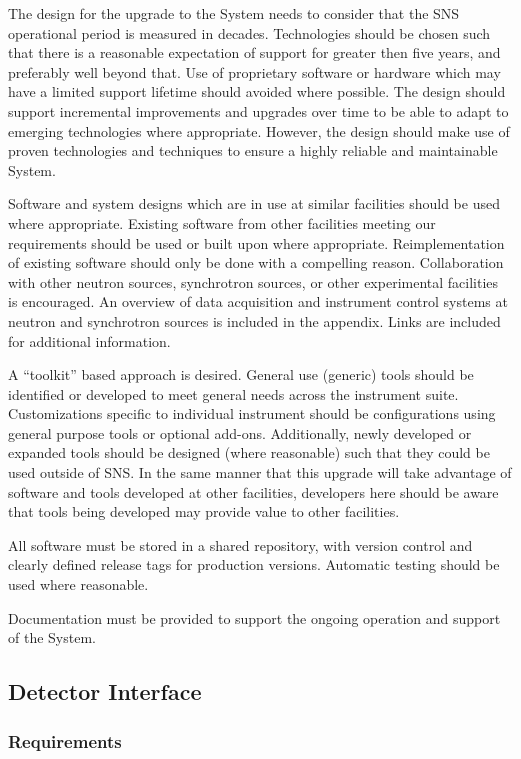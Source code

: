 The design for the upgrade to the System needs to consider that the SNS
operational period is measured in decades. Technologies should be chosen
such that there is a reasonable expectation of support for greater then
five years, and preferably well beyond that.  Use of proprietary software
or hardware which may have a limited support lifetime should avoided where
possible. The design should support incremental improvements and upgrades
over time to be able to adapt to emerging technologies where appropriate.
However, the design should make use of proven technologies and techniques
to ensure a highly reliable and maintainable System.

Software and system designs which are in use at similar facilities
should be used where appropriate.  Existing software from other
facilities meeting our requirements should be used or built upon where
appropriate.  Reimplementation of existing software should only be done
with a compelling reason.  Collaboration with other neutron sources,
synchrotron sources, or other experimental facilities is encouraged.
An overview of data acquisition and instrument control systems at neutron
and synchrotron sources is included in the appendix. Links are included
for additional information.

A ``toolkit'' based approach is desired. General use (generic) tools
should be identified or developed to meet general needs across the
instrument suite. Customizations specific to individual instrument should
be configurations using general purpose tools or optional add-ons.
Additionally, newly developed or expanded tools should be designed
(where reasonable) such that they could be used outside of SNS. In the
same manner that this upgrade will take advantage of software and tools
developed at other facilities, developers here should be aware that
tools being developed may provide value to other facilities.

All software must be stored in a shared repository, with version
control and clearly defined release tags for production versions.
Automatic testing should be used where reasonable.

Documentation must be provided to support the ongoing operation and
support of the System.

\subsection{Detector Interface}
\subsubsection{Requirements}

